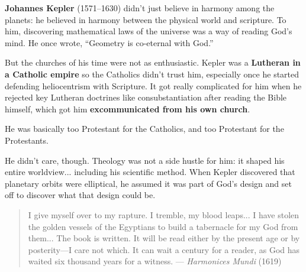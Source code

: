 \begin{tcolorbox}[colback=blue!5!white, colframe=blue!50!black, breakable, title=Historical Sidebar: Kepler’s Theology—Excommunicated From All Sides]

  \textbf{Johannes Kepler} (1571–1630) didn’t just believe in harmony among the planets: he believed in harmony between the physical world and scripture. To him, discovering mathematical laws of the universe was a way of reading God’s mind. He once wrote, ``Geometry is co-eternal with God.''

  \medskip

  But the churches of his time were not as enthusiastic.  Kepler was a \textbf{Lutheran in a Catholic empire} so the Catholics didn’t trust him, especially once he started defending heliocentrism with Scripture. It got really complicated for him when he rejected key Lutheran doctrines like consubstantiation after reading the Bible himself, which got him \textbf{excommunicated from his own church}.  

  \medskip
  
  He was basically too Protestant for the Catholics, and too Protestant for the Protestants.

  \medskip

  He didn't care, though. Theology was not a side hustle for him: it shaped his entire worldview... including his scientific method. When Kepler discovered that planetary orbits were elliptical, he assumed it was part of God’s design and set off to discover what that design could be.


  \begin{quote}
  I give myself over to my rapture. I tremble, my blood leaps... I have stolen the golden vessels of the Egyptians to build a tabernacle for my God from them... The book is written. It will be read either by the present age or by posterity—I care not which. It can wait a century for a reader, as God has waited six thousand years for a witness.
  --- \textit{Harmonices Mundi} (1619)
  \end{quote}


\end{tcolorbox}


